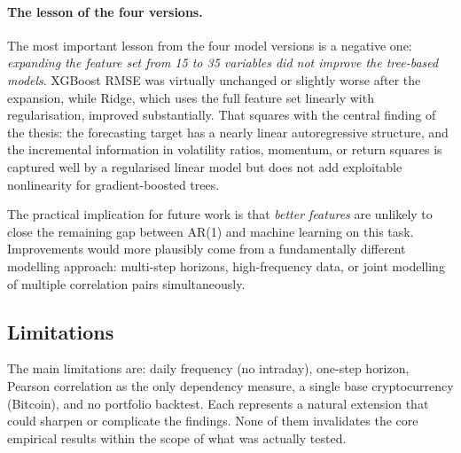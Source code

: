 \paragraph{The lesson of the four versions.}
The most important lesson from the four model versions is a negative one:
\emph{expanding the feature set from 15 to 35 variables did not improve the tree-based models}.
XGBoost RMSE was virtually unchanged or slightly worse after the expansion, while Ridge,
which uses the full feature set linearly with regularisation, improved substantially.
That squares with the central finding of the thesis: the forecasting target has
a nearly linear autoregressive structure, and the incremental information in
volatility ratios, momentum, or return squares is captured well by a regularised linear
model but does not add exploitable nonlinearity for gradient-boosted trees.

The practical implication for future work is that \emph{better features} are unlikely to
close the remaining gap between AR(1) and machine learning on this task.
Improvements would more plausibly come from a fundamentally different modelling approach:
multi-step horizons, high-frequency data, or joint modelling of multiple correlation pairs
simultaneously.

\subsection{Limitations}

The main limitations are: daily frequency (no intraday), one-step horizon, Pearson correlation as the only dependency measure, a single base cryptocurrency (Bitcoin), and no portfolio backtest. Each represents a natural extension that could sharpen or complicate the findings. None of them invalidates the core empirical results within the scope of what was actually tested.
